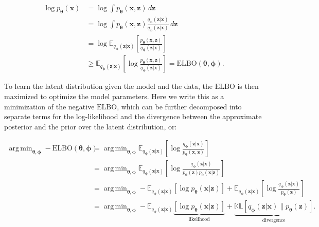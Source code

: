 \documentclass[11pt,a4paper,oneside]{book}
\DeclareMathOperator*{\argmin}{arg\,min}
\begin{document}
\begin{appendices}
\begin{subequations}
\begin{align}
    \log p_{\boldsymbol{\theta}}(\mathbf{x}) &= \log \int p_{\boldsymbol{\theta}}(\mathbf{x}, \mathbf{z}) \, d\mathbf{z} \\
    &= \log \int p_{\boldsymbol{\theta}}(\mathbf{x}, \mathbf{z}) \frac{q_{\boldsymbol{\phi}}(\mathbf{z} | \mathbf{x})}{q_{\boldsymbol{\phi}}(\mathbf{z} | \mathbf{x})} \, d\mathbf{z} \\
    &= \log \mathbb{E}_{q_{\boldsymbol{\phi}}(\mathbf{z} | \mathbf{x})}\left[\frac{p_{\boldsymbol{\theta}}(\mathbf{x}, \mathbf{z})}{q_{\boldsymbol{\phi}}(\mathbf{z} | \mathbf{x})}\right] \\
    &\geq \mathbb{E}_{    q_{\boldsymbol{\phi}}(\mathbf{z} | \mathbf{x})}\left[\log\frac{p_{\boldsymbol{\theta}}(\mathbf{x}, \mathbf{z})}{q_{\boldsymbol{\phi}}(\mathbf{z} | \mathbf{x})}\right] = \mathrm{ELBO}(\boldsymbol{\theta}, \boldsymbol{\phi}).
\end{align}
\end{subequations}

To learn the latent distribution given the model and the data, the $\mathrm{ELBO}$ is then maximized to optimize the model parameters. Here we write this as a minimization of the negative $\mathrm{ELBO}$, which can be further decomposed into separate terms for the log-likelihood and the divergence between the approximate posterior and the prior over the latent distribution, or:

\begin{subequations}
\begin{align}
    \argmin_{\boldsymbol{\theta}, \boldsymbol{\phi}}-\mathrm{ELBO}(\boldsymbol{\theta}, \boldsymbol{\phi}) &= \argmin_{\boldsymbol{\theta}, \boldsymbol{\phi}} \mathbb{E}_{    q_{\boldsymbol{\phi}}(\mathbf{z} | \mathbf{x})}\left[ \log\frac{q_{\boldsymbol{\phi}}(\mathbf{z} | \mathbf{x})}{p_{\boldsymbol{\theta}}(\mathbf{x}, \mathbf{z})}\right] \\
    &= \argmin_{\boldsymbol{\theta}, \boldsymbol{\phi}} \mathbb{E}_{    q_{\boldsymbol{\phi}}(\mathbf{z} | \mathbf{x})}\left[ \log\frac{q_{\boldsymbol{\phi}}(\mathbf{z} | \mathbf{x})}{p_{\boldsymbol{\theta}}(\mathbf{z})p_{\boldsymbol{\theta}}(\mathbf{x} | \mathbf{z})}\right] \\ 
    &= \argmin_{\boldsymbol{\theta}, \boldsymbol{\phi}} -\mathbb{E}_{    q_{\boldsymbol{\phi}}(\mathbf{z} | \mathbf{x})}\left[ \log p_{\boldsymbol{\theta}}(\mathbf{x} | \mathbf{z})\right] + \mathbb{E}_{    q_{\boldsymbol{\phi}}(\mathbf{z} | \mathbf{x})}\left[ \log\frac{q_{\boldsymbol{\phi}}(\mathbf{z} | \mathbf{x})}{p_{\boldsymbol{\theta}}(\mathbf{z})}\right] \label{eq:expected_elbo}\\
    &= \argmin_{\boldsymbol{\theta}, \boldsymbol{\phi}} -\mathbb{E}_{q_{\boldsymbol{\phi}}(\mathbf{z} | \mathbf{x})}\underbrace{\left[\log p_{\boldsymbol{\theta}}(\mathbf{x} | \mathbf{z})\right]}_{\textrm{likelihood}} + \underbrace{\mathbb{KL}[q_{\boldsymbol{\phi}}(\mathbf{z} | \mathbf{x}) \| p_{\boldsymbol{\theta}}(\mathbf{z})]}_{\textrm{divergence}}. \label{eq:elbo_2}
\end{align}
\end{subequations}


\end{appendices}
\end{document}
